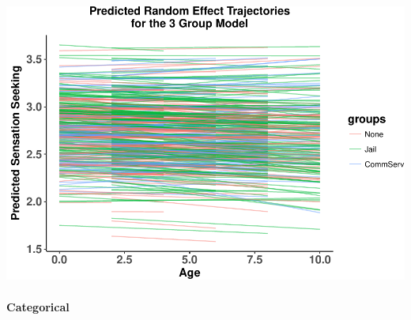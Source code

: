 \documentclass[]{article}
\let\oldparagraph\paragraph
\renewcommand{\paragraph}[1]{\oldparagraph{#1}\mbox{}}
\begin{document}
\includegraphics{Conditional_Models_doc_files/figure-latex/unnamed-chunk-36-1.pdf}

\paragraph{Categorical}\label{categorical-4}
\end{document}
